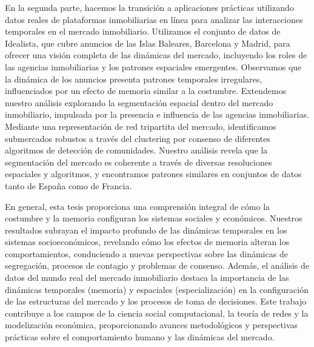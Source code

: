 En la segunda parte, hacemos la transición a aplicaciones prácticas utilizando datos reales de plataformas inmobiliarias en línea para analizar las interacciones temporales en el mercado inmobiliario. Utilizamos el conjunto de datos de Idealista, que cubre anuncios de las Islas Baleares, Barcelona y Madrid, para ofrecer una visión completa de las dinámicas del mercado, incluyendo los roles de las agencias inmobiliarias y los patrones espaciales emergentes. Observamos que la dinámica de los anuncios presenta patrones temporales irregulares, influenciados por un efecto de memoria similar a la costumbre. Extendemos nuestro análisis explorando la segmentación espacial dentro del mercado inmobiliario, impulsada por la presencia e influencia de las agencias inmobiliarias. Mediante una representación de red tripartita del mercado, identificamos submercados robustos a través del clustering por consenso de diferentes algoritmos de detección de comunidades. Nuestro análisis revela que la segmentación del mercado es coherente a través de diversas resoluciones espaciales y algoritmos, y encontramos patrones similares en conjuntos de datos tanto de España como de Francia.

En general, esta tesis proporciona una comprensión integral de cómo la costumbre y la memoria configuran los sistemas sociales y económicos. Nuestros resultados subrayan el impacto profundo de las dinámicas temporales en los sistemas socioeconómicos, revelando cómo los efectos de memoria alteran los comportamientos, conduciendo a nuevas perspectivas sobre las dinámicas de segregación, procesos de contagio y problemas de consenso. Además, el análisis de datos del mundo real del mercado inmobiliario destaca la importancia de las dinámicas temporales (memoria) y espaciales (especialización) en la configuración de las estructuras del mercado y los procesos de toma de decisiones. Este trabajo contribuye a los campos de la ciencia social computacional, la teoría de redes y la modelización económica, proporcionando avances metodológicos y perspectivas prácticas sobre el comportamiento humano y las dinámicas del mercado.


\vfill